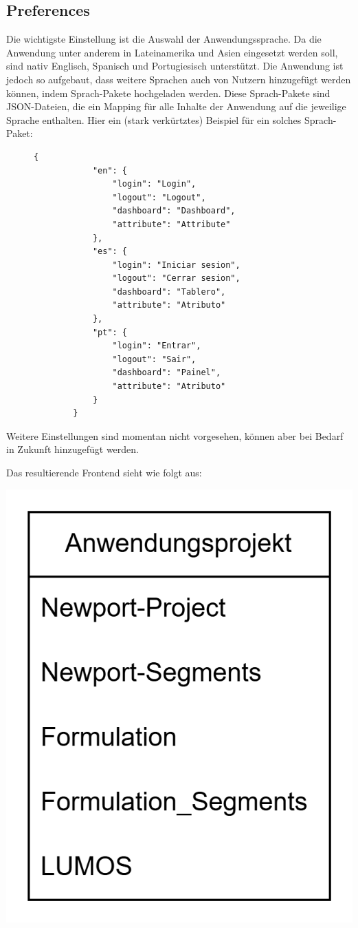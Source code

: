 \subsection{Preferences}
Die wichtigste Einstellung ist die Auswahl der Anwendungssprache. Da die Anwendung unter anderem in Lateinamerika und Asien eingesetzt werden soll, sind nativ 
Englisch, Spanisch und Portugiesisch unterstützt. Die Anwendung ist jedoch so aufgebaut, dass weitere Sprachen auch von Nutzern hinzugefügt werden können, 
indem Sprach-Pakete hochgeladen werden. Diese Sprach-Pakete sind JSON-Dateien, die ein Mapping für alle Inhalte der Anwendung auf die jeweilige Sprache enthalten.
Hier ein (stark verkürtztes) Beispiel für ein solches Sprach-Paket:
\begin{figure}[H]
    \begin{lstlisting}[caption=Beispiel für ein Sprach-Paket, label=list:languagePackage]
        {
            "en": {
                "login": "Login",
                "logout": "Logout",
                "dashboard": "Dashboard",
                "attribute": "Attribute"
            },
            "es": {
                "login": "Iniciar sesion",
                "logout": "Cerrar sesion",
                "dashboard": "Tablero",
                "attribute": "Atributo"
            },
            "pt": {
                "login": "Entrar",
                "logout": "Sair",
                "dashboard": "Painel",
                "attribute": "Atributo"
            }
        }
    \end{lstlisting}
\end{figure}
Weitere Einstellungen sind momentan nicht vorgesehen, können aber bei Bedarf in Zukunft hinzugefügt werden.

Das resultierende Frontend sieht wie folgt aus:
\begin{center}
    \includegraphics[width=\linewidth]{./img/projektGrafik.png}
\end{center}